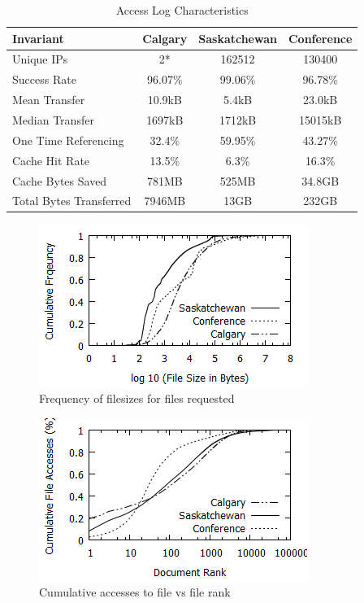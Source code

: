 \documentclass[10pt,conference]{IEEEtran}
\begin{document}
\begin{table}
    \caption{Access Log Characteristics}\label{tab:characteristics}
    \begin{tabular}[ht!]{ | l || c | c | c | }
        \hline
        Invariant & Calgary & Saskatchewan & Conference \\
        \hline
        Unique IPs & 2* & 162512 & 130400 \\
        Success Rate & 96.07\% & 99.06\% & 96.78\% \\
        Mean Transfer & 10.9kB & 5.4kB & 23.0kB \\
        Median Transfer & 1697kB & 1712kB & 15015kB \\
        One Time Referencing & 32.4\% & 59.95\% & 43.27\% \\
        Cache Hit Rate & 13.5\% & 6.3\% & 16.3\% \\
        Cache Bytes Saved & 781MB & 525MB & 34.8GB \\
        Total Bytes Transferred & 7946MB & 13GB & 232GB \\
        \hline
    \end{tabular}
\end{table}

\begin{figure}
    \includegraphics{images/filesize}
    \caption{Frequency of filesizes for files requested}\label{fig:filesize}
\end{figure}

\begin{figure}
    \includegraphics{images/concentration}
    \caption{Cumulative accesses to file vs file rank}\label{fig:file_accesses}
\end{figure}
\end{document}
